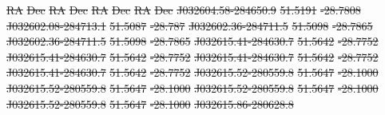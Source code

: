 \documentclass[11pt, a4paper]{book}
\providecommand{\DIFdeltex}[1]{{\protect\color{red}\sout{#1}}}                      %
\providecommand{\DIFdel}[1]{\texorpdfstring{\DIFdeltex{#1}}{}} %
\begin{document}
\DIFdel{RA }%
\DIFdel{Dec }%
\DIFdel{RA }%
\DIFdel{Dec }%
\DIFdel{RA }%
\DIFdel{Dec }%
\DIFdel{RA }%
\DIFdel{Dec }%
\DIFdel{J032604.58-284650.9 }%
\DIFdel{51.5191 }%
\DIFdel{-28.7808 }%
\DIFdel{J032602.08-284713.1 }%
\DIFdel{51.5087 }%
\DIFdel{-28.787 }%
\DIFdel{J032602.36-284711.5 }%
\DIFdel{51.5098 }%
\DIFdel{-28.7865 }%
\DIFdel{J032602.36-284711.5 }%
\DIFdel{51.5098 }%
\DIFdel{-28.7865}%
\DIFdel{J032615.41-284630.7 }%
\DIFdel{51.5642 }%
\DIFdel{-28.7752 }%
\DIFdel{J032615.41-284630.7 }%
\DIFdel{51.5642 }%
\DIFdel{-28.7752 }%
\DIFdel{J032615.41-284630.7 }%
\DIFdel{51.5642 }%
\DIFdel{-28.7752 }%
\DIFdel{J032615.41-284630.7 }%
\DIFdel{51.5642 }%
\DIFdel{-28.7752}%
\DIFdel{J032615.52-280559.8 }%
\DIFdel{51.5647 }%
\DIFdel{-28.1000 }%
\DIFdel{J032615.52-280559.8 }%
\DIFdel{51.5647 }%
\DIFdel{-28.1000 }%
\DIFdel{J032615.52-280559.8 }%
\DIFdel{51.5647 }%
\DIFdel{-28.1000 }%
\DIFdel{J032615.52-280559.8 }%
\DIFdel{51.5647 }%
\DIFdel{-28.1000}%
\DIFdel{J032615.86-280628.8 }%
\end{document}
